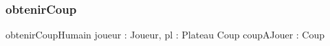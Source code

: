 \subsubsection{obtenirCoup}
\begin{algorithme}
\fonction
{obtenirCoupHumain}
{joueur : Joueur, pl : Plateau}
{Coup}
{coupAJouer : Coup}
{
	{}
	{}

}
\end{algorithme}